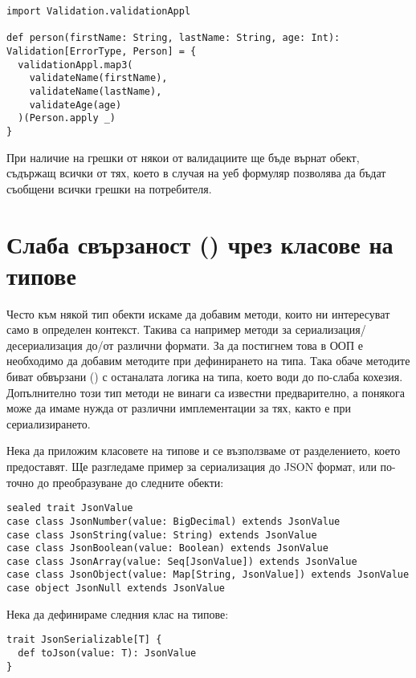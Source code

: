 \begin{lstlisting}
import Validation.validationAppl

def person(firstName: String, lastName: String, age: Int): Validation[ErrorType, Person] = {
  validationAppl.map3(
    validateName(firstName),
    validateName(lastName),
    validateAge(age)
  )(Person.apply _)
}
\end{lstlisting}

При наличие на грешки от някои от валидациите ще бъде върнат  обект, съдържащ всички от тях, което в случая на уеб формуляр позволява да бъдат съобщени всички грешки на потребителя.

\section{Слаба свързаност () чрез класове на типове}

Често към някой тип обекти искаме да добавим методи, които ни интересуват само в определен контекст. Такива са например методи за сериализация/десериализация до/от различни формати. За да постигнем това в ООП е необходимо да добавим методите при дефинирането на типа. Така обаче методите биват обвързани () с останалата логика на типа, което води до по-слаба кохезия. Допълнително този тип методи не винаги са известни предварително, а понякога може да имаме нужда от различни имплементации за тях, както е при сериализирането.

Нека да приложим класовете на типове и се възползваме от разделението, което предоставят. Ще разгледаме пример за сериализация до JSON формат, или по-точно до преобразуване до следните обекти:

\begin{lstlisting}
sealed trait JsonValue
case class JsonNumber(value: BigDecimal) extends JsonValue
case class JsonString(value: String) extends JsonValue
case class JsonBoolean(value: Boolean) extends JsonValue
case class JsonArray(value: Seq[JsonValue]) extends JsonValue
case class JsonObject(value: Map[String, JsonValue]) extends JsonValue
case object JsonNull extends JsonValue
\end{lstlisting}

Нека да дефинираме следния клас на типове:

\begin{lstlisting}
trait JsonSerializable[T] {
  def toJson(value: T): JsonValue
}
\end{lstlisting}

